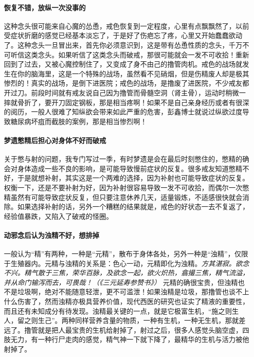 \paragraph{恢复不错，放纵一次没事的}

这种念头很可能来自心魔的怂恿，戒色恢复到一定程度，心里有点飘飘然了，以前受症状折磨的感觉已经基本淡忘了，于是好了伤疤忘了疼，心里又开始蠢蠢欲动了。这种念头一旦冒出来，首先你必须意识到，这是带有怂恿性质的念头，千万不可听信这类念头。如果听信了这类念头而破戒，那很可能就会一发不可收拾！重新回到了过去，又被心魔控制住了，又变成了身不由己的撸管肉机。戒色的战场就发生在你的脑海里，这是一个特殊的战场，虽然看不见硝烟，但是伤精废人却是极其惨烈的！真实的战场，是倒下进医院；戒色的战场，是撸废了进医院，不少戒友都开过刀。前段时间就有戒友说自己因为撸管而骨髓空洞（肾主骨），运动时稍微一摔就骨折了，要开刀固定钢板，那是相当疼啊！如果不是自己亲身经历或者有很深的阅历，一般人很难了知纵欲会带来如此严重的危害，彭鑫博士就说过纵欲过度导致糖尿病坏疽而截肢的案例，那是相当惨烈啊！

\paragraph{梦遗憋精后担心对身体不好而破戒}

关于憋与射的问题，我专门写过一季，有时梦遗是会在最后时刻憋住的，憋精的确会对身体造成一些不良的影响，是可能导致慢前症状的反复。很多戒友知道憋精不好，于是就想补射，其实这是一个两难的选择，因为补射也可能导致症状的反复。权衡一下，还是不要补射为好，因为补射很容易导致一发不可收拾，而偶尔一次憋精虽然有可能导致症状反复，但只要注意休养几天，适量锻炼，不适感很快就会消除。如果选择补射的话，另外一个糟糕的结果就是，戒色的好状态一去不复返了，经验值暴跌，又陷入了破戒的怪圈。

\paragraph{动邪念后认为浊精不好，想排掉}

一般认为“精”有两种，一种是“元精”，散布于身体各处，另外一种是“浊精”，仅限于生殖器内。元精与浊精的关系是：色心一动，元精即化为浊精。\textit{方其湛寂。欲念不兴。精气散于三焦，荣华百脉，及欲念一起，欲火炽热，翕撮三焦，精气流溢，并从命门输泻而去，可畏哉！（《三元延寿参赞书》）} 元精的确很宝贵，但浊精也不是垃圾啊，绝对不能随意轻泄，更不可滥泄！如果浊精是垃圾，那撸管也谈不上什么伤害了，然而浊精亦极具营养价值，现代西医的研究也证实了精液的重要性，而且还有未知成分有待发现。浊精最关键的一点，就是它极富生机，“施之则生人，留之则生己”。两种同样营养含量的物质，一种有生机，一种无生机，那就差远了。撸管就是把人最宝贵的生机给射掉了，射过之后，很多人感觉头脑空虚，四肢无力，有一种行尸走肉的感觉，精气神一下就下降了，最精华的生机与活力被他射掉了。

